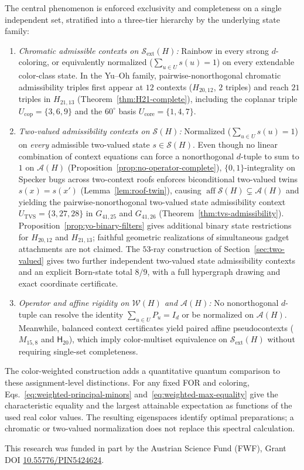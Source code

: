 \documentclass[aps,pra,reprint,superscriptaddress,longbibliography,nofootinbib,floatfix,10pt]{revtex4-2}
\theoremstyle{definition}\newtheorem{definition}[theorem]{Definition}
\theoremstyle{remark}\newtheorem{remark}[theorem]{Remark}
\newcommand{\Sc}{\mathcal S}\newcommand{\Cc}{\mathcal C}\newcommand{\Wc}{\mathcal W}
\newcommand{\Htwenty}{\mathsf H_{20}}
\begin{document}
The central phenomenon is enforced exclusivity and completeness on a single independent set, stratified into a three-tier hierarchy by the underlying state family:
\begin{enumerate}
\item \emph{Chromatic admissible contexts on $\Sc_{\mathrm{ext}}(H)$:} Rainbow in every strong $d$-coloring, or equivalently normalized ($\sum_{u\in U}s(u)=1$) on every extendable color-class state. In the Yu--Oh family, pairwise-nonorthogonal chromatic admissibility triples first appear at $12$ contexts ($H_{20,12}$, $2$ triples) and reach $21$ triples in $H_{21,13}$ (Theorem~\ref{thm:H21-complete}), including the coplanar triple $U_{\mathrm{cop}}=\{3,6,9\}$ and the $60^\circ$ basis $U_{\mathrm{core}}=\{1,4,7\}$.
\item \emph{Two-valued admissibility contexts on $\Sc(H)$:} Normalized ($\sum_{u\in U}s(u)=1$) on \emph{every} admissible two-valued state $s\in\Sc(H)$. Even though no linear combination of context equations can force a nonorthogonal $d$-tuple to sum to $1$ on $\mathcal A(H)$ (Proposition~\ref{prop:no-operator-complete}), $\{0,1\}$-integrality on Specker bugs across two-context roofs enforces biconditional two-valued twins $s(x)=s(x')$ (Lemma~\ref{lem:roof-twin}), causing $\operatorname{aff}\Sc(H)\subsetneq\mathcal A(H)$ and yielding the pairwise-nonorthogonal two-valued state admissibility context $U_{\mathrm{TVS}}=\{3,27,28\}$ in $G_{41,25}$ and $G_{41,26}$ (Theorem~\ref{thm:tvs-admissibility}). Proposition~\ref{prop:yo-binary-filters} gives additional binary state restrictions for $H_{20,12}$ and $H_{21,13}$; faithful geometric realizations of simultaneous gadget attachments are not claimed. The $53$-ray construction of Section~\ref{sec:two-valued} gives two further independent two-valued state admissibility contexts and an explicit Born-state total $8/9$, with a full hypergraph drawing and exact coordinate certificate.
\item \emph{Operator and affine rigidity on $\Wc(H)$ and $\mathcal A(H)$:} No nonorthogonal $d$-tuple can resolve the identity $\sum_{u\in U}P_u=I_d$ or be normalized on $\mathcal A(H)$. Meanwhile, balanced context certificates yield paired affine pseudocontexts ($M_{15,8}$ and $\Htwenty$), which imply color-multiset equivalence on $\Sc_{\mathrm{ext}}(H)$ without requiring single-set completeness.
\end{enumerate}

The color-weighted construction adds a quantitative quantum comparison to these assignment-level distinctions. For any fixed FOR and coloring, Eqs.~\eqref{eq:weighted-principal-minors} and~\eqref{eq:weighted-max-equality} give the characteristic equality and the largest attainable expectation as functions of the used real color values. The resulting eigenspaces identify optimal preparations; a chromatic or two-valued normalization does not replace this spectral calculation.

\begin{acknowledgments}
This research was funded in part by the Austrian Science Fund (FWF), Grant DOI \href{https://doi.org/10.55776/PIN5424624}{10.55776/PIN5424624}.
\end{acknowledgments}


\end{document}
